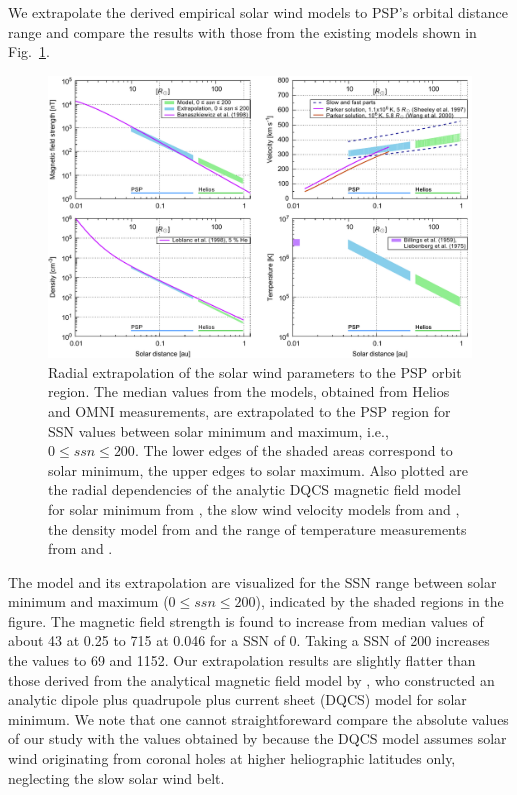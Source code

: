 We extrapolate the derived empirical solar wind models to PSP’s orbital distance range and compare the results with those from the existing models shown in Fig.~\ref{fig:sw_extrapolation_ssn_f_plot}.
\begin{figure}
	\includegraphics[width=18cm]{figures/sw_extrapolation_ssn_f_plot.pdf}
	\caption{Radial extrapolation of the solar wind parameters to the PSP orbit region. The median values from the models, obtained from Helios and OMNI measurements, are extrapolated to the PSP region for SSN values between solar minimum and maximum, i.e., $0 \le ssn \le 200$. The lower edges of the shaded areas correspond to solar minimum, the upper edges to solar maximum. Also plotted are the radial dependencies of the analytic DQCS magnetic field model for solar minimum from \citet{Banaszkiewicz1998}, the slow wind velocity models from \citet{Sheeley1997} and \citet{Wang2000}, the density model from \citet{Leblanc1998} and the range of temperature measurements from \citet{Billings1959} and \citet{Liebenberg1975}.}
	\label{fig:sw_extrapolation_ssn_f_plot}
\end{figure}
The model and its extrapolation are visualized for the SSN range between solar minimum and maximum ($0 \le ssn \le 200$), indicated by the shaded regions in the figure.
The magnetic field strength is found to increase from median values of about \SI{43}{\nT} at \SI{0.25}{\au} to \SI{715}{\nT} at \SI{0.046}{\au} for a SSN of 0. Taking a SSN of 200 increases the values to \SI{69}{\nT} and \SI{1152}{\nT}. Our extrapolation results are slightly flatter than those derived from the analytical magnetic field model by \citet{Banaszkiewicz1998}, who constructed an analytic dipole plus quadrupole plus current sheet (DQCS) model for solar minimum. We note that one cannot straightforeward compare the absolute values of our study with the values obtained by \citet{Banaszkiewicz1998} because the DQCS model assumes solar wind originating from coronal holes at higher heliographic latitudes only, neglecting the slow solar wind belt.
